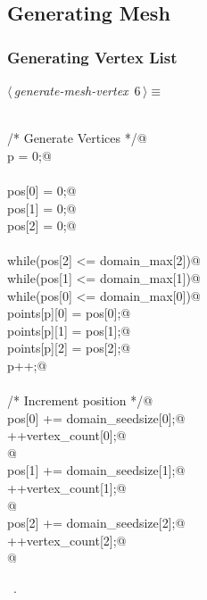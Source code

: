 \documentclass[a4paper,11pt]{article}
\begin{document}
\subsection{Generating Mesh}

\subsubsection{Generating Vertex List}
\begin{flushleft} \small
\begin{minipage}{\linewidth}\label{scrap4}\raggedright\small
{} $\langle\,${\itshape generate-mesh-vertex}\nobreak\ {\footnotesize {6}}$\,\rangle\equiv$
\vspace{-1ex}
\begin{list}{}{} \item
\mbox{}\verb@@\\
\mbox{}\verb@/* Generate Vertices */@\\
\mbox{}\verb@    p = 0;@\\
\mbox{}\verb@@\\
\mbox{}\verb@    pos[0] = 0;@\\
\mbox{}\verb@    pos[1] = 0;@\\
\mbox{}\verb@    pos[2] = 0;@\\
\mbox{}\verb@@\\
\mbox{}\verb@    while(pos[2] <= domain_max[2]){@\\
\mbox{}\verb@        while(pos[1] <= domain_max[1]){@\\
\mbox{}\verb@            while(pos[0] <= domain_max[0]){@\\
\mbox{}\verb@                points[p][0] = pos[0];@\\
\mbox{}\verb@                points[p][1] = pos[1];@\\
\mbox{}\verb@                points[p][2] = pos[2];@\\
\mbox{}\verb@                p++;@\\
\mbox{}\verb@@\\
\mbox{}\verb@                /* Increment position */@\\
\mbox{}\verb@                pos[0] += domain_seedsize[0];@\\
\mbox{}\verb@                ++vertex_count[0];@\\
\mbox{}\verb@            }@\\
\mbox{}\verb@            pos[1] += domain_seedsize[1];@\\
\mbox{}\verb@            ++vertex_count[1];@\\
\mbox{}\verb@        }@\\
\mbox{}\verb@        pos[2] += domain_seedsize[2];@\\
\mbox{}\verb@        ++vertex_count[2];@\\
\mbox{}\verb@    }@\\
\mbox{}\verb@@{\NWsep}
\end{list}
\vspace{-1.5ex}
\footnotesize
\begin{list}{}{\setlength{\itemsep}{-\parsep}\setlength{\itemindent}{-\leftmargin}}
\item \NWtxtMacroRefIn\ .


\end{list}
\end{minipage}
\end{flushleft}
\end{document}
